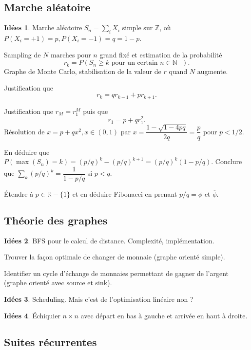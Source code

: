 \documentclass[a4paper,12pt, notitlepage]{article}
\theoremstyle{definition}
\newtheorem{idee}{Idées}
\newcommand{\N}{\mathbb{N}}
\newcommand{\R}{\mathbb{R}}
\begin{document}
\subsection{Marche aléatoire}

\begin{idee}
	Marche aléatoire $S_n = \sum_i X_i$ simple sur $\mathbb{Z}$, où $P(X_i = +1) = p, P(X_i = -1) = q = 1-p$.
	
	Sampling de $N$ marches pour $n$ grand fixé et estimation de la probabilité
		\[ r_k = P(S_n \geq k \text{ pour un certain $n\in\N$ }). \]
	Graphe de Monte Carlo, stabilisation de la valeur de $r$ quand $N$ augmente.
	
	Justification que 
		\[ r_k = q r_{k-1} + p r_{k+1}. \]
		
	Justification que $r_M = r_1^M$ puis que
		\[ r_1 = p + q r_1^2. \]
	Résolution de $x = p + qx^2, x \in (0,1)$ par $x = \dfrac{1-\sqrt{1-4pq}}{2q} = \dfrac{p}{q}$ pour $p<1/2$.
	
	En déduire que $P(\max(S_n) = k) = (p/q)^k - (p/q)^{k+1} = (p/q)^k (1-p/q)$. 
	Conclure que $\sum_k (p/q)^k = \dfrac{1}{1-p/q}$ si $p<q$.
	
	Étendre à $p \in\R-\{1\}$ et en déduire Fibonacci en prenant $p/q = \phi$ et $\overline{\phi}$.
\end{idee}


\subsection{Théorie des graphes}

\begin{idee}
	BFS pour le calcul de distance. Complexité, implémentation.
	
	Trouver la façon optimale de changer de monnaie (graphe orienté simple).
	
	Identifier un cycle d'échange de monnaies permettant de gagner de l'argent (graphe orienté avec source et sink).
\end{idee}

\begin{idee}
	Scheduling. Mais c'est de l'optimisation linéaire non ?
\end{idee}

\begin{idee}
	Échiquier $n \times n$ avec départ en bas à gauche et arrivée en haut à droite.
	
\end{idee}

\subsection{Suites récurrentes}
\end{document}
